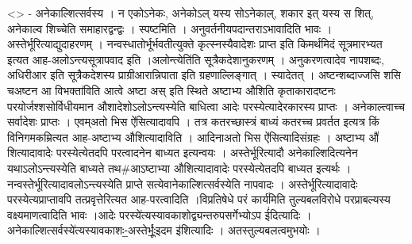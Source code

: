 \textless{}\textgreater{} - अनेकाल्शित्सर्वस्य । न एकोऽनेकः, अनेकोऽल्
यस्य सोऽनेकाल्, शकार इत् यस्य स शित्, अनेकाल्व शिच्चेति समाहारद्वन्द्वः
। स्पष्टमिति । अनुवर्तनीयपदान्तराऽभावादिति भावः ।
अस्तेर्भूरित्याद्युदाहरणम् । नन्वस्धातोर्भूर्भवतीत्युक्ते
कृत्स्नस्यैवादेशः प्राप्त इति किमर्थमिदं सूत्रमारभ्यत इत्यत
आह-अलोऽन्त्यसूत्रापवाद इति ।अलोन्त्येति॑ति सूत्रैकदेशानुकरणम् ।
अनुकरणत्वादेव नापशब्दः, अधिरीआर इति सूत्रैकदेशस्य प्राग्रीआरान्निपाता
इति ग्रहणाल्लिङ्गात् । स्यादेतत् । अष्टन्शब्दाज्जसि शसि चअष्टन आ
विभक्ता॑विति आत्वे अष्टा अस् इति स्थिते अष्टाभ्य औशिति कृताकारादष्टनः
परयोर्जश्शसोर्विधीयमान औशादेशोऽलोऽन्त्यस्येति बाधित्वा आदेः
परस्येत्यादेरकारस्य प्राप्तः । अनेकाल्त्वाच्च सर्वादेशः प्राप्तः ।
एवम्अतो भिस ऐ॑सित्यादावपि । तत्र कतरच्छास्त्रं बाध्यं कतरच्च प्रवर्तत
इत्यत्र किं विनिगमकम्रित्यत आह-अष्टाभ्य औशित्यादाविति । आदिनाअतो भिस
ऐ॑सित्यादिसंग्रहः । अष्टाभ्य औ॑ शित्यादावादेः परस्येत्येतदपि परत्वादनेन
बाध्यत इत्यन्वयः । अस्तेर्भूरित्यादौ अनेकाल्शिदित्यनेन
यथाऽलोऽन्त्यस्येति बाध्यते तथ\#आऽष्टाभ्या औशित्यादावादेः परस्येत्येतदपि
बाध्यत इत्यर्थः । नन्वस्तेर्भूरित्यादावलोऽन्त्यस्येति प्राप्ते
सत्येवानेकाल्शित्सर्वस्येति नापवादः । अस्तेर्भूरित्यादावादेः
परस्येत्यप्राप्तावपि तत्प्रवृत्तेरित्यत आह-परत्वादिति ।विप्रतिषेधे परं
कार्य॑मिति तुल्यबलविरोधे परप्राबल्यस्य वक्ष्यमाणत्वादिति भावः ।आदेः
परस्ये॑त्यस्यावकाशोद्व्यन्तरुपसर्गेभ्योऽप ई॑दित्यादिः
।अनेकाल्शित्सर्वस्ये॑त्यस्यावकाशः-॒अस्तेर्भूः॒॑इदम इ॑शित्यादिः ।
अतस्तुल्यबलत्वमुभयोः ।
